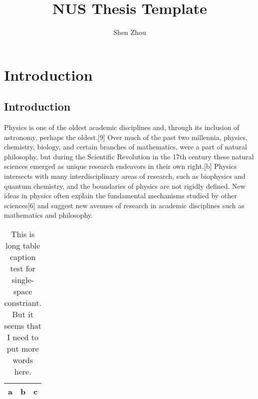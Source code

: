 \documentclass[a4paper, 12pt]{NUSThesis}
\title{NUS Thesis Template}
\author{Shen Zhou}
\begin{document}
\maketitle
\tableofcontents
\chapter{Introduction}
\section{Introduction}
Physics is one of the oldest academic disciplines and, through its inclusion of astronomy, perhaps the oldest.[9] Over much of the past two millennia, physics, chemistry, biology, and certain branches of mathematics, were a part of natural philosophy, but during the Scientific Revolution in the 17th century these natural sciences emerged as unique research endeavors in their own right.[b] Physics intersects with many interdisciplinary areas of research, such as biophysics and quantum chemistry, and the boundaries of physics are not rigidly defined. New ideas in physics often explain the fundamental mechanisms studied by other sciences[6] and suggest new avenues of research in academic disciplines such as mathematics and philosophy. 
\begin{table}[htpb]
    \centering
    \caption{This is long table caption test for single-space constriant. But
    it seems that I need to put more words here.}
    \begin{tabular}{ccc}
        \hline
        a & b & c\\
        \hline
    \end{tabular}
\end{table}
\end{document}

